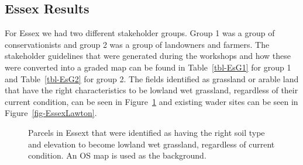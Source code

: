 \documentclass[
  12pt,
  letterpaper,
  DIV=11,
  numbers=noendperiod]{scrartcl}
\begin{document}
\newpage{}

\subsection{Essex Results}\label{essex-results}

For Essex we had two different stakeholder groups. Group 1 was a group
of conservationists and group 2 was a group of landowners and farmers.
The stakeholder guidelines that were generated during the workshops and
how these were converted into a graded map can be found in
Table~\ref{tbl-EsG1} for group 1 and Table~\ref{tbl-EsG2} for group 2.
The fields identified as grassland or arable land that have the right
characteristics to be lowland wet grassland, regardless of their current
condition, can be seen in Figure~\ref{fig-EssexSuitHab} and existing
wader sites can be seen in Figure~\ref{fig-EssexLawton}.

\begin{figure}[H]


\caption{\label{fig-EssexSuitHab}Parcels in Essext that were identified
as having the right soil type and elevation to become lowland wet
grassland, regardless of current condition. An OS map is used as the
background.}

\end{figure}%
\end{document}

